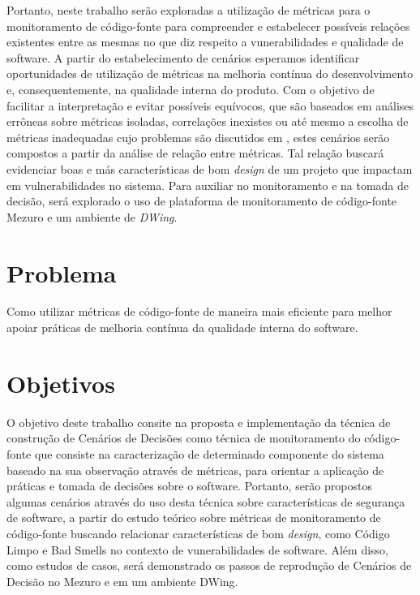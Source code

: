 %

Portanto, neste trabalho serão exploradas a utilização de métricas para o monitoramento de código-fonte para compreender e estabelecer possíveis relações existentes entre as mesmas no que diz respeito a vunerabilidades e qualidade de software. A partir do estabelecimento de cenários esperamos identificar oportunidades de utilização de métricas na melhoria contínua do desenvolvimento e, consequentemente, na qualidade interna do produto. Com o objetivo de facilitar a interpretação e evitar possíveis equívocos, que são baseados em análises errôneas sobre métricas isoladas, correlações inexistes ou até mesmo a escolha de métricas inadequadas cujo problemas são discutidos em \cite{chidamber1994}, estes cenários serão compostos a partir da análise de relação entre métricas. Tal relação buscará evidenciar boas e más características de bom \emph{design} de um projeto que impactam em vulnerabilidades no sistema.
%
Para auxiliar no monitoramento e na tomada de decisão, será explorado o uso de plataforma de monitoramento de código-fonte Mezuro e um ambiente de \emph{DWing}.



\section{Problema}

%
Como utilizar métricas de código-fonte de maneira mais eficiente para melhor apoiar práticas de melhoria contínua da qualidade interna do software.

\section{Objetivos}

O objetivo deste trabalho consite na proposta e implementação da técnica de construção de Cenários de Decisões como técnica de monitoramento do código-fonte que consiste na caracterização de determinado componente do sistema baseado na sua observação através de métricas, para orientar a aplicação de práticas e tomada de decisões sobre o software. Portanto, serão propostos algumas cenários através do uso desta técnica sobre características de segurança de software, a partir do estudo teórico sobre métricas de monitoramento de código-fonte buscando relacionar características de bom \emph{design}, como Código Limpo e Bad Smells no contexto de vunerabilidades de software. Além disso, como estudos de casos, será demonstrado os passos de reprodução de Cenários de Decisão no Mezuro e em um ambiente DWing.

